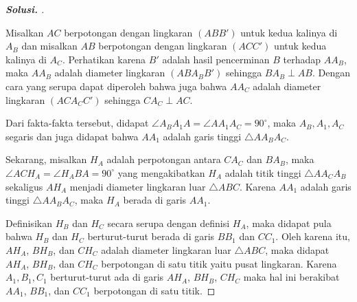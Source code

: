 \documentclass[letterpaper, 13pt]{scrartcl}
\begin{document}
\begin{proof}[\textbf{Solusi. }]
\begin{center}
\end{center}

    Misalkan $AC$ berpotongan dengan lingkaran $(ABB')$ untuk kedua kalinya di $A_B$ dan misalkan $AB$ berpotongan dengan lingkaran $(ACC')$ untuk kedua kalinya di $A_C$. Perhatikan karena $B'$ adalah hasil pencerminan $B$ terhadap $AA_B$, maka $AA_B$ adalah diameter lingkaran $(ABA_BB')$ sehingga  $BA_B \perp AB$. Dengan cara yang serupa dapat diperoleh bahwa juga bahwa $AA_C$ adalah diameter lingkaran $(ACA_CC')$ sehingga $CA_C \perp AC$.
    
    Dari fakta-fakta tersebut, didapat $\angle A_BA_1A = \angle AA_1A_C = 90^\circ$, maka $A_B, A_1, A_C$ segaris dan juga didapat bahwa $AA_1$ adalah garis tinggi $\triangle AA_BA_C$.
    
    Sekarang, misalkan $H_A$ adalah perpotongan antara $CA_C$ dan $BA_B$, maka $\angle ACH_A = \angle H_ABA = 90^\circ$ yang mengakibatkan $H_A$ adalah titik tinggi $\triangle AA_CA_B$ sekaligus $AH_A$ menjadi diameter lingkaran luar $\triangle ABC$. Karena $AA_1$ adalah garis tinggi $\triangle AA_BA_C$, maka $H_A$ berada di garis $AA_1$.
    
    Definisikan $H_B$ dan $H_C$ secara serupa dengan definisi $H_A$, maka didapat pula bahwa $H_B$ dan $H_C$ berturut-turut berada di garis $BB_1$ dan $CC_1$. Oleh karena itu, $AH_A$, $BH_B$, dan $CH_C$ adalah diameter lingkaran luar $\triangle ABC$, maka didapat $AH_A$, $BH_B$, dan $CH_C$ berpotongan di satu titik yaitu pusat lingkaran. Karena $A_1,B_1,C_1$ berturut-turut ada di garis $AH_A$, $BH_B$, $CH_C$ maka hal ini berakibat $AA_1$, $BB_1$, dan $CC_1$ berpotongan di satu titik.
\end{proof}
\end{document}
